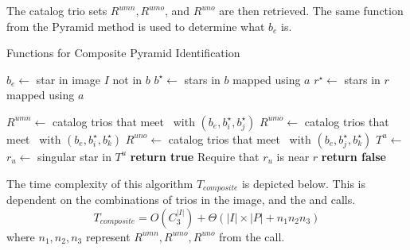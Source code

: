 The catalog trio sets $R^{umn}, R^{umo}$, and $R^{uno}$ are then retrieved.
The same function  from the Pyramid method is used to determine what $b_e$ is.
\begin{algorithm}
    \caption{Functions for Composite Pyramid Identification} \label{algorithm:compositePyramidHelpers}
    \begin{algorithmic}[1]
        \State $b_e \gets $ star in image $I$ not in $b$
        \State $b^{\star} \gets $ stars in $b$ mapped using $a$
        \State $r^{\star} \gets $ stars in $r$ mapped using $a$

        \State $R^{umn} \gets $ catalog trios that meet~ with $(b_e, b^{\star}_i,
        b^{\star}_j)$
        \State $R^{umo} \gets $ catalog trios that meet~ with $(b_e, b^{\star}_i,
        b^{\star}_k)$
        \State $R^{uno} \gets $ catalog trios that meet~ with $(b_e, b^{\star}_j,
        b^{\star}_k)$
        \State $T^u \gets $ 
        \\
        \State $r_u \gets $ singular star in $T^u$
        \State \textbf{return true} \Comment Require that $r_u$ is near $r$
        \EndIf
        \EndIf
        \State \textbf{return false}
        \EndFunction
    \end{algorithmic}
\end{algorithm}

The time complexity of this algorithm $T_{composite}$ is depicted below.
This is dependent on the combinations of trios in the image, and the  and  calls.
\begin{equation}
    T_{composite} = O\left( C^{|I|}_3 \right) + \Theta\left( |I| \times |P| + n_1 n_2 n_3 \right)
\end{equation}
where $n_1, n_2, n_3$ represent $R^{umn}, R^{umo}, R^{uno}$ from the  call.

\begin{table*}[ht]
\end{table*}